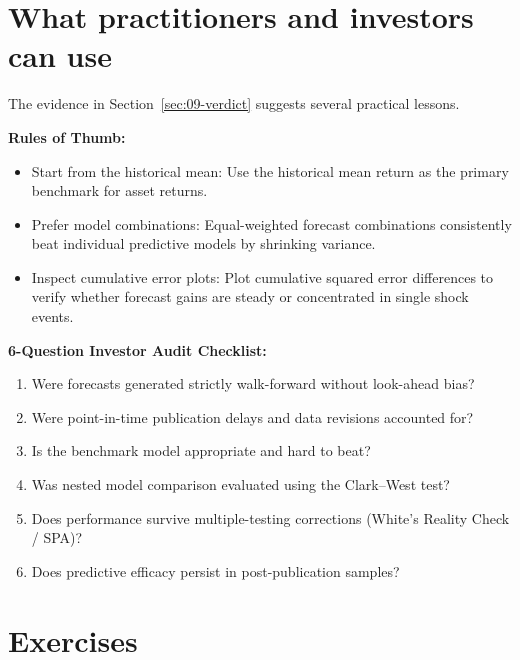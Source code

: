 \section{What practitioners and investors can use}
\label{sec:09-investors}

The evidence in Section~\ref{sec:09-verdict} suggests several practical lessons.

\textbf{Rules of Thumb:}
\begin{itemize}
  \item Start from the historical mean: Use the historical mean return as the primary benchmark for asset returns.
  \item Prefer model combinations: Equal-weighted forecast combinations consistently beat individual predictive models by shrinking variance.
  \item Inspect cumulative error plots: Plot cumulative squared error differences to verify whether forecast gains are steady or concentrated in single shock events.
\end{itemize}

\textbf{6-Question Investor Audit Checklist:}
\begin{enumerate}
  \item Were forecasts generated strictly walk-forward without look-ahead bias?
  \item Were point-in-time publication delays and data revisions accounted for?
  \item Is the benchmark model appropriate and hard to beat?
  \item Was nested model comparison evaluated using the Clark--West test?
  \item Does performance survive multiple-testing corrections (White's Reality Check / SPA)?
  \item Does predictive efficacy persist in post-publication samples?
\end{enumerate}

\section*{Exercises}

